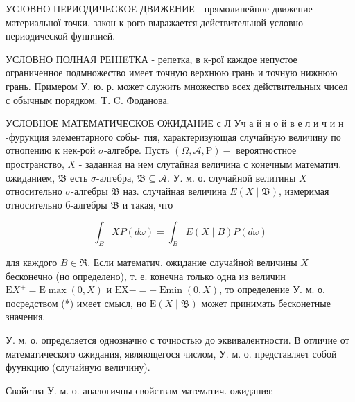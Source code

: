 \documentclass[10pt]{article}
\begin{document}
УСЈОВНО ПЕРИОДИЧЕСКОЕ ДВИЖЕНИЕ - прямолинейное движение материальної точки, закон к-рого выражается деӥствительной условно периодической фуннuиeй.



УСЛОВНО ПОЛНАЯ РЕIIIEТКА - репетка, в к-рої каждое непустое ограниченное подмножество имеет точную верхнюю грань и точную нижнюю грань. Примером У. ю. р. может служить множество всех действительных чисел с обычным порядком. T. C. Фоданова.



УСЛОВНОЕ МАТЕМАТИЧЕСКОЕ ОЖИДАНИЕ с Л Уч а й н о й в е л и ч и н -фурукция элементарного собы- тия, характеризующая случайную величину по отнопению к нек-рой $\sigma$-алгебре. Пусть $(\Omega, \mathcal{A}, \mathrm{P})-$ вероятностное пространство, $X$ - заданная на нем слутайная величина с конечным математич. ожиданием, $\mathfrak{B}$ есть $\sigma$-алгебра, $\mathfrak{B} \subseteq \mathcal{A}$. У. м. о. случайной велитины $X$ относительно $\sigma$-алгебры $\mathfrak{B}$ наз. случайная величина $E(X \mid \mathfrak{B})$, измеримая относительно б-алгебры $\mathfrak{B}$ и такая, что



\[

\int_{B} X P(d \omega)=\int_{B} E(X \mid B) P(d \omega)

\]



для каждого $B \in \Re$. Если математич. ожидание случайной величины $X$ бесконечно (но определено), т. е. конечна только одна из величин $\mathrm{E} X^{+}=\mathrm{E} \max (0, X)$ и $\mathrm{EX}-=-\operatorname{Emin}(0, X)$, то определение У. м. о. посредством (*) имеет смысл, но $\mathrm{E}(X \mid \mathfrak{B})$ может принимать бесконетные значения.



У. м. о. определяется однозначно с точностью до эквивалентности. В отличие от математического ожидания, являющегося числом, У. м. о. представляет собой фуункцию (случайную величину).



Свойства У. м. о. аналогичны свойствам математич. ожидания:
\end{document}

